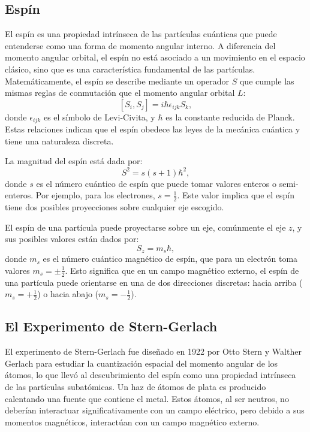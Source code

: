 \subsection*{Espín}
\noindent
El espín es una propiedad intrínseca de las partículas cuánticas que puede entenderse como una forma de momento angular interno. A diferencia del momento angular orbital, el espín no está asociado a un movimiento en el espacio clásico, sino que es una característica fundamental de las partículas. Matemáticamente, el espín se describe mediante un operador $S$ que cumple las mismas reglas de conmutación que el momento angular orbital $L$:
\[
[S_i, S_j] = i\hbar \epsilon_{ijk} S_k,
\]
donde $\epsilon_{ijk}$ es el símbolo de Levi-Civita, y $\hbar$ es la constante reducida de Planck. Estas relaciones indican que el espín obedece las leyes de la mecánica cuántica y tiene una naturaleza discreta.

\noindent
La magnitud del espín está dada por:
\[
S^2 = s(s+1)\hbar^2,
\]
donde $s$ es el número cuántico de espín que puede tomar valores enteros o semi-enteros. Por ejemplo, para los electrones, $s = \frac{1}{2}$. Este valor implica que el espín tiene dos posibles proyecciones sobre cualquier eje escogido.

\noindent
El espín de una partícula puede proyectarse sobre un eje, comúnmente el eje $z$, y sus posibles valores están dados por:
\[
S_z = m_s \hbar,
\]
donde $m_s$ es el número cuántico magnético de espín, que para un electrón toma valores $m_s = \pm\frac{1}{2}$. Esto significa que en un campo magnético externo, el espín de una partícula puede orientarse en una de dos direcciones discretas: hacia arriba ($m_s = +\frac{1}{2}$) o hacia abajo ($m_s = -\frac{1}{2}$).

\subsection*{El Experimento de Stern-Gerlach}
\noindent
El experimento de Stern-Gerlach fue diseñado en 1922 por Otto Stern y Walther Gerlach para estudiar la cuantización espacial del momento angular de los átomos, lo que llevó al descubrimiento del espín como una propiedad intrínseca de las partículas subatómicas.
\noindent
Un haz de átomos de plata es producido calentando una fuente que contiene el metal. Estos átomos, al ser neutros, no deberían interactuar significativamente con un campo eléctrico, pero debido a sus momentos magnéticos, interactúan con un campo magnético externo. 

